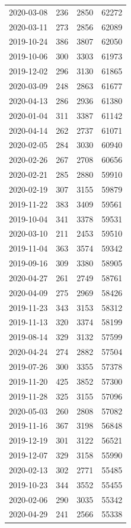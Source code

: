 \begin{tabular}{lrrr}
2020-03-08 & 236 & 2850 & 62272 \\
2020-03-11 & 273 & 2856 & 62089 \\
2019-10-24 & 386 & 3807 & 62050 \\
2019-10-06 & 300 & 3303 & 61973 \\
2019-12-02 & 296 & 3130 & 61865 \\
2020-03-09 & 248 & 2863 & 61677 \\
2020-04-13 & 286 & 2936 & 61380 \\
2020-01-04 & 311 & 3387 & 61142 \\
2020-04-14 & 262 & 2737 & 61071 \\
2020-02-05 & 284 & 3030 & 60940 \\
2020-02-26 & 267 & 2708 & 60656 \\
2020-02-21 & 285 & 2880 & 59910 \\
2020-02-19 & 307 & 3155 & 59879 \\
2019-11-22 & 383 & 3409 & 59561 \\
2019-10-04 & 341 & 3378 & 59531 \\
2020-03-10 & 211 & 2453 & 59510 \\
2019-11-04 & 363 & 3574 & 59342 \\
2019-09-16 & 309 & 3380 & 58905 \\
2020-04-27 & 261 & 2749 & 58761 \\
2020-04-09 & 275 & 2969 & 58426 \\
2019-11-23 & 343 & 3153 & 58312 \\
2019-11-13 & 320 & 3374 & 58199 \\
2019-08-14 & 329 & 3132 & 57599 \\
2020-04-24 & 274 & 2882 & 57504 \\
2019-07-26 & 300 & 3355 & 57378 \\
2019-11-20 & 425 & 3852 & 57300 \\
2019-11-28 & 325 & 3155 & 57096 \\
2020-05-03 & 260 & 2808 & 57082 \\
2019-11-16 & 367 & 3198 & 56848 \\
2019-12-19 & 301 & 3122 & 56521 \\
2019-12-07 & 329 & 3158 & 55990 \\
2020-02-13 & 302 & 2771 & 55485 \\
2019-10-23 & 344 & 3552 & 55455 \\
2020-02-06 & 290 & 3035 & 55342 \\
2020-04-29 & 241 & 2566 & 55338 \\

\end{tabular}
